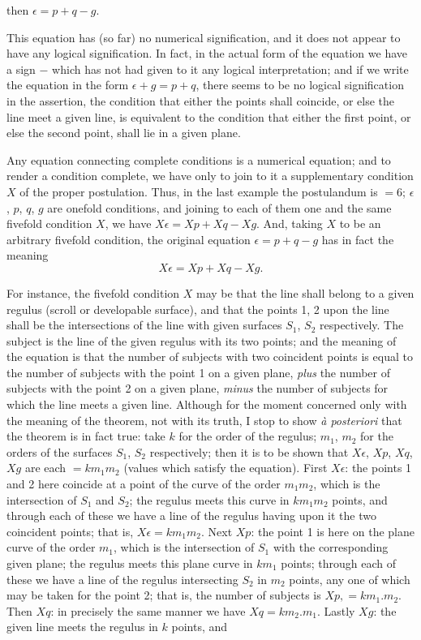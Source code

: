 \documentclass[11pt,a4paper]{book}
\begin{document}
\hspace*{2em} then $\epsilon = p + q - g$.

This equation has (so far) no numerical signification, and it does not appear to have any logical signification. In fact, in the actual form of the equation we have a sign $-$ which has not had given to it any logical interpretation; and if we write the equation in the form $\epsilon + g = p + q$, there seems to be no logical signification in the assertion, the condition that either the points shall coincide, or else the line meet a given line, is equivalent to the condition that either the first point, or else the second point, shall lie in a given plane.

Any equation connecting complete conditions is a numerical equation; and to render a condition complete, we have only to join to it a supplementary condition $X$ of the proper postulation. Thus, in the last example the postulandum is $= 6$; $\epsilon$, $p$, $q$, $g$ are onefold conditions, and joining to each of them one and the same fivefold condition $X$, we have $X\epsilon = Xp + Xq - Xg$. And, taking $X$ to be an arbitrary fivefold condition, the original equation $\epsilon = p + q - g$ has in fact the meaning
\[
X\epsilon = Xp + Xq - Xg.
\]

For instance, the fivefold condition $X$ may be that the line shall belong to a given regulus (scroll or developable surface), and that the points 1, 2 upon the line shall be the intersections of the line with given surfaces $S_1$, $S_2$ respectively. The subject is the line of the given regulus with its two points; and the meaning of the equation is that the number of subjects with two coincident points is equal to the number of subjects with the point 1 on a given plane, \textit{plus} the number of subjects with the point 2 on a given plane, \textit{minus} the number of subjects for which the line meets a given line. Although for the moment concerned only with the meaning of the theorem, not with its truth, I stop to show \textit{\`{a} posteriori} that the theorem is in fact true: take $k$ for the order of the regulus; $m_1$, $m_2$ for the orders of the surfaces $S_1$, $S_2$ respectively; then it is to be shown that $X\epsilon$, $Xp$, $Xq$, $Xg$ are each $= km_1m_2$ (values which satisfy the equation). First $X\epsilon$: the points 1 and 2 here coincide at a point of the curve of the order $m_1m_2$, which is the intersection of $S_1$ and $S_2$; the regulus meets this curve in $km_1m_2$ points, and through each of these we have a line of the regulus having upon it the two coincident points; that is, $X\epsilon = km_1m_2$. Next $Xp$: the point 1 is here on the plane curve of the order $m_1$, which is the intersection of $S_1$ with the corresponding given plane; the regulus meets this plane curve in $km_1$ points; through each of these we have a line of the regulus intersecting $S_2$ in $m_2$ points, any one of which may be taken for the point 2; that is, the number of subjects is $Xp, = km_1.m_2$. Then $Xq$: in precisely the same manner we have $Xq = km_2.m_1$. Lastly $Xg$: the given line meets the regulus in $k$ points, and
\end{document}
